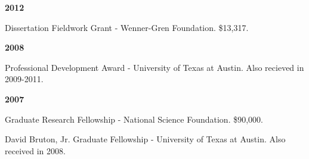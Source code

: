 \documentclass{article}
\begin{document}
\begin{description*}
\item[] {\bfseries 2012}
\item[] Dissertation Fieldwork Grant - Wenner-Gren Foundation. \$13,317.
\end{description*}

\begin{description*}
\item[] {\bfseries 2008}
\item[] Professional Development Award - University of Texas at Austin. Also recieved in 2009-2011.
\end{description*}

\begin{description*}
\item[] {\bfseries 2007}
\item[] Graduate Research Fellowship - National Science Foundation. \$90,000.


\item[] David Bruton, Jr. Graduate Fellowship - University of Texas at Austin. Also received in 2008.
\end{description*}
\end{document}
